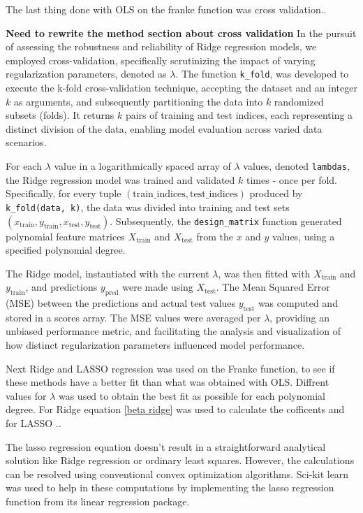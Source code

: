 \noindent The last thing done with OLS on the franke function was cross validation.. 

\textbf{Need to rewrite the method section about cross validation}
In the pursuit of assessing the robustness and reliability of Ridge regression models, we employed cross-validation, specifically scrutinizing the impact of varying regularization parameters, denoted as \(\lambda\). The function \texttt{k\_fold}, was developed to execute the k-fold cross-validation technique, accepting the dataset and an integer \(k\) as arguments, and subsequently partitioning the data into \(k\) randomized subsets (folds). It returns \(k\) pairs of training and test indices, each representing a distinct division of the data, enabling model evaluation across varied data scenarios.

For each \(\lambda\) value in a logarithmically spaced array of \(\lambda\) values, denoted \texttt{lambdas}, the Ridge regression model was trained and validated \(k\) times - once per fold. Specifically, for every tuple \((\text{train\_indices}, \text{test\_indices})\) produced by \texttt{k\_fold(data, k)}, the data was divided into training and test sets \((x_{\text{train}}, y_{\text{train}}, x_{\text{test}}, y_{\text{test}})\).
Subsequently, the \texttt{design\_matrix} function generated polynomial feature matrices \(X_{\text{train}}\) and \(X_{\text{test}}\) from the \(x\) and \(y\) values, using a specified polynomial degree. 

The Ridge model, instantiated with the current \(\lambda\), was then fitted with \(X_{\text{train}}\) and \(y_{\text{train}}\), and predictions \(y_{\text{pred}}\) were made using \(X_{\text{test}}\). The Mean Squared Error (MSE) between the predictions and actual test values \(y_{\text{test}}\) was computed and stored in a scores array.
The MSE values were averaged per \(\lambda\), providing an unbiased performance metric, and facilitating the analysis and visualization of how distinct regularization parameters influenced model performance.


\noindent Next Ridge and LASSO regression was used on the Franke function,
to see if these methods have a better fit than what was obtained with OLS.
Diffrent values for $\lambda$ was used to obtain the best fit as possible for each
polynomial degree. For Ridge equation \eqref{beta ridge} was used to calculate
the cofficents and for LASSO ..

\noindent The lasso regression equation doesn't result in a straightforward analytical solution like Ridge regression or ordinary least squares. However, the calculations can be resolved using conventional convex optimization algorithms. Sci-kit learn was used to help in these computations by implementing the lasso regression function from its linear regression package.


